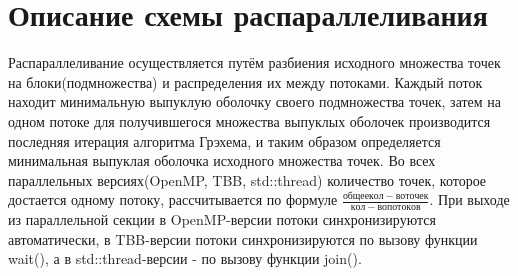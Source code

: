 \documentclass{report}
\begin{document}
\section*{Описание схемы распараллеливания}
\par Распараллеливание осуществляется путём разбиения исходного множества точек на блоки(подмножества) и распределения их между потоками. Каждый поток находит минимальную выпуклую оболочку своего подмножества точек, затем на одном потоке для получившегося множества выпуклых оболочек производится последняя итерация алгоритма Грэхема, и таким образом определяется минимальная выпуклая оболочка исходного множества точек. Во всех параллельных версиях(OpenMP, TBB, std::thread) количество точек, которое достается одному потоку, рассчитывается по формуле $\frac{общее кол-во точек}{кол-во потоков}$. При выходе из параллельной секции в OpenMP-версии потоки синхронизируются автоматически, в TBB-версии потоки синхронизируются по вызову функции wait(), а в std::thread-версии - по вызову функции join().

\newpage

\end{document}
